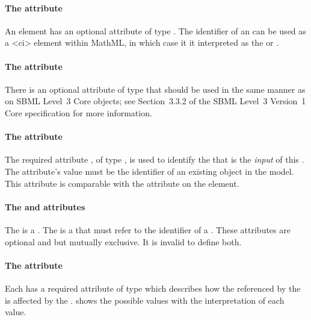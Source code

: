 \paragraph{The  attribute}
An \Input element has an optional  attribute of type . The identifier of an \Input can be used as a 
<ci> element within MathML, in which case it it interpreted as the  or .

\paragraph{The  attribute}
There is an optional  attribute of type  that should be used
in the same manner as on SBML Level~3 Core
objects; see Section~3.3.2 of the SBML Level~3 Version~1 Core
specification for more information.


\paragraph{The  attribute}
The required attribute , of type , is used to identify the \QualitativeSpecies that is the \emph{input} of this \Transition.  The attribute's value must be the identifier of an existing \QualitativeSpecies object in the model.  This attribute is comparable with the  attribute on the  element.

\paragraph{The  and  attributes}
The  is a . The  is a  that must refer to the identifier of a \SymbolicValue. These attributes are optional and but mutually exclusive. It is invalid to define both.


\paragraph{The  attribute}
Each \Input has a required attribute  of type  which describes how the \QualitativeSpecies referenced by the \Input is affected by the \Transition.  shows the possible values with the interpretation of each value.

